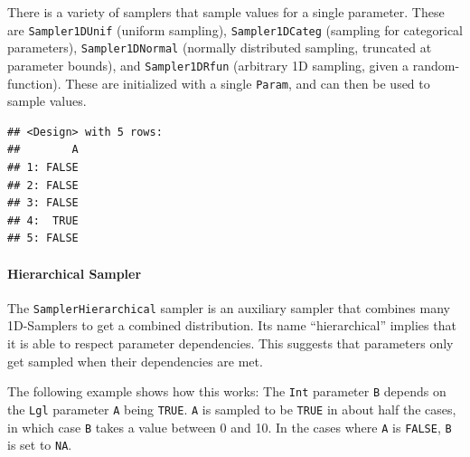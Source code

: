 \documentclass[
]{scrbook}
\newenvironment{Shaded}{\begin{snugshade}}{\end{snugshade}}
\newcommand{\DecValTok}[1]{\textcolor[rgb]{0.00,0.00,0.81}{#1}}
\newcommand{\FunctionTok}[1]{\textcolor[rgb]{0.00,0.00,0.00}{#1}}
\newcommand{\NormalTok}[1]{#1}
\newcommand{\OtherTok}[1]{\textcolor[rgb]{0.56,0.35,0.01}{#1}}
\newcommand{\SpecialCharTok}[1]{\textcolor[rgb]{0.00,0.00,0.00}{#1}}
\renewenvironment{Shaded} {\begin{snugshade}\small} {\end{snugshade}}
\begin{document}
There is a variety of samplers that sample values for a single parameter.
These are \texttt{Sampler1DUnif} (uniform sampling), \texttt{Sampler1DCateg} (sampling for categorical parameters), \texttt{Sampler1DNormal} (normally distributed sampling, truncated at parameter bounds), and \texttt{Sampler1DRfun} (arbitrary 1D sampling, given a random-function).
These are initialized with a single \texttt{Param}, and can then be used to sample values.

\begin{Shaded}
\end{Shaded}

\begin{verbatim}
## <Design> with 5 rows:
##        A
## 1: FALSE
## 2: FALSE
## 3: FALSE
## 4:  TRUE
## 5: FALSE
\end{verbatim}

\hypertarget{hierarchical-sampler}{%
\paragraph{Hierarchical Sampler}\label{hierarchical-sampler}}

The \texttt{SamplerHierarchical} sampler is an auxiliary sampler that combines many 1D-Samplers to get a combined distribution.
Its name ``hierarchical'' implies that it is able to respect parameter dependencies.
This suggests that parameters only get sampled when their dependencies are met.

The following example shows how this works: The \texttt{Int} parameter \texttt{B} depends on the \texttt{Lgl} parameter \texttt{A} being \texttt{TRUE}.
\texttt{A} is sampled to be \texttt{TRUE} in about half the cases, in which case \texttt{B} takes a value between 0 and 10.
In the cases where \texttt{A} is \texttt{FALSE}, \texttt{B} is set to \texttt{NA}.
\end{document}
